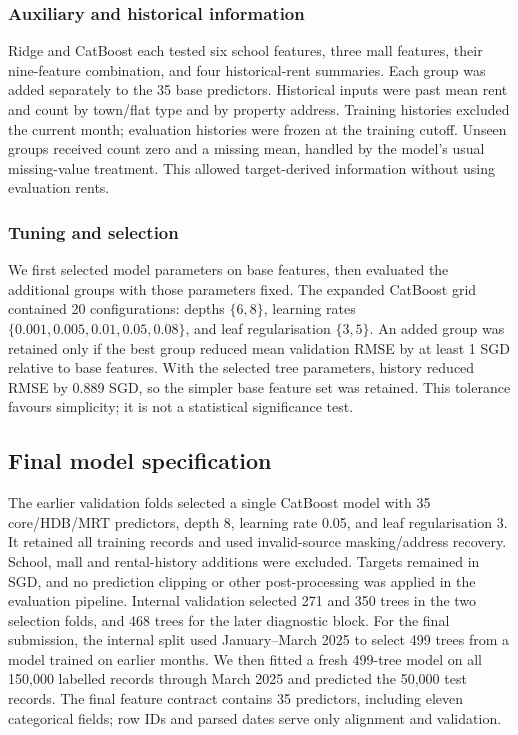 \documentclass[conference]{IEEEtran}
\begin{document}
\subsubsection{Auxiliary and historical information}
Ridge and CatBoost each tested six school features, three mall features,
their nine-feature combination, and four historical-rent summaries. Each
group was added separately to the 35 base predictors. Historical inputs
were past mean rent and count by town/flat type and by property address.
Training histories excluded the current month; evaluation histories were
frozen at the training cutoff. Unseen groups received count zero and a
missing mean, handled by the model's usual missing-value treatment.
This allowed target-derived information without using evaluation rents.

\subsubsection{Tuning and selection}
We first selected model parameters on base features, then evaluated the
additional groups with those parameters fixed. The expanded CatBoost grid
contained 20 configurations: depths $\{6,8\}$, learning rates
$\{0.001,0.005,0.01,0.05,0.08\}$, and leaf regularisation $\{3,5\}$.
An added group was retained only if the best group reduced mean validation
RMSE by at least 1 SGD relative to base features. With the selected tree
parameters, history reduced RMSE by 0.889 SGD, so the simpler base feature
set was retained. This tolerance favours simplicity; it is not a statistical significance test.

\subsection{Final model specification}
\label{sec:finalmodel}
The earlier validation folds selected a single CatBoost model with
35 core/HDB/MRT predictors, depth 8, learning rate 0.05, and leaf
regularisation 3. It retained all training records and used invalid-source
masking/address recovery. School, mall and rental-history additions were
excluded. Targets remained in SGD, and no prediction clipping or other
post-processing was applied in the evaluation pipeline. Internal validation
selected 271 and 350 trees in the two selection folds, and 468 trees for
the later diagnostic block. For the final submission, the internal split
used January--March 2025 to select 499 trees from a model trained on earlier
months. We then fitted a fresh 499-tree model on all 150,000 labelled
records through March 2025 and predicted the 50,000 test records. The final
feature contract contains 35 predictors, including eleven categorical
fields; row IDs and parsed dates serve only alignment and validation.
\end{document}

